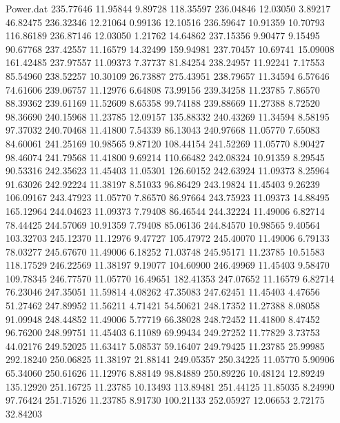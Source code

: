 \begin{filecontents}{Power.dat}
 235.77646   11.95844    9.89728  118.35597
 236.04846   12.03050    3.89217   46.82475
 236.32346   12.21064    0.99136   12.10516
 236.59647   10.91359   10.70793  116.86189
 236.87146   12.03050    1.21762   14.64862
 237.15356    9.90477    9.15495   90.67768
 237.42557   11.16579   14.32499  159.94981
 237.70457   10.69741   15.09008  161.42485
 237.97557   11.09373    7.37737   81.84254
 238.24957   11.92241    7.17553   85.54960
 238.52257   10.30109   26.73887  275.43951
 238.79657   11.34594    6.57646   74.61606
 239.06757   11.12976    6.64808   73.99156
 239.34258   11.23785    7.86570   88.39362
 239.61169   11.52609    8.65358   99.74188
 239.88669   11.27388    8.72520   98.36690
 240.15968   11.23785   12.09157  135.88332
 240.43269   11.34594    8.58195   97.37032
 240.70468   11.41800    7.54339   86.13043
 240.97668   11.05770    7.65083   84.60061
 241.25169   10.98565    9.87120  108.44154
 241.52269   11.05770    8.90427   98.46074
 241.79568   11.41800    9.69214  110.66482
 242.08324   10.91359    8.29545   90.53316
 242.35623   11.45403   11.05301  126.60152
 242.63924   11.09373    8.25964   91.63026
 242.92224   11.38197    8.51033   96.86429
 243.19824   11.45403    9.26239  106.09167
 243.47923   11.05770    7.86570   86.97664
 243.75923   11.09373   14.88495  165.12964
 244.04623   11.09373    7.79408   86.46544
 244.32224   11.49006    6.82714   78.44425
 244.57069   10.91359    7.79408   85.06136
 244.84570   10.98565    9.40564  103.32703
 245.12370   11.12976    9.47727  105.47972
 245.40070   11.49006    6.79133   78.03277
 245.67670   11.49006    6.18252   71.03748
 245.95171   11.23785   10.51583  118.17529
 246.22569   11.38197    9.19077  104.60900
 246.49969   11.45403    9.58470  109.78345
 246.77570   11.05770   16.49651  182.41353
 247.07652   11.16579    6.82714   76.23046
 247.35051   11.59814    4.08262   47.35083
 247.62451   11.45403    4.47656   51.27462
 247.89952   11.56211    4.71421   54.50621
 248.17352   11.27388    8.08058   91.09948
 248.44852   11.49006    5.77719   66.38028
 248.72452   11.41800    8.47452   96.76200
 248.99751   11.45403    6.11089   69.99434
 249.27252   11.77829    3.73753   44.02176
 249.52025   11.63417    5.08537   59.16407
 249.79425   11.23785   25.99985  292.18240
 250.06825   11.38197   21.88141  249.05357
 250.34225   11.05770    5.90906   65.34060
 250.61626   11.12976    8.88149   98.84889
 250.89226   10.48124   12.89249  135.12920
 251.16725   11.23785   10.13493  113.89481
 251.44125   11.85035    8.24990   97.76424
 251.71526   11.23785    8.91730  100.21133
 252.05927   12.06653    2.72175   32.84203

\end{filecontents}

